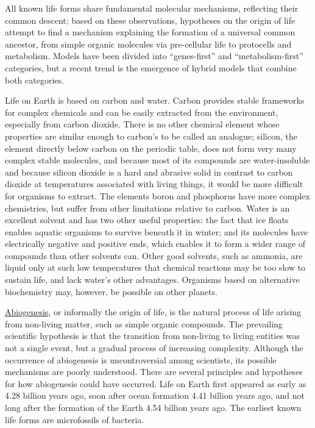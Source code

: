 All known life forms share fundamental molecular mechanisms, reflecting their common descent; based on these observations, hypotheses on the origin of life attempt to find a mechanism explaining the formation of a universal common ancestor, from simple organic molecules via pre-cellular life to protocells and metabolism. Models have been divided into ``genes-first'' and ``metabolism-first'' categories, but a recent trend is the emergence of hybrid models that combine both categories.

Life on Earth is based on carbon and water. Carbon provides stable frameworks for complex chemicals and can be easily extracted from the environment, especially from carbon dioxide. There is no other chemical element whose properties are similar enough to carbon's to be called an analogue; silicon, the element directly below carbon on the periodic table, does not form very many complex stable molecules, and because most of its compounds are water-insoluble and because silicon dioxide is a hard and abrasive solid in contrast to carbon dioxide at temperatures associated with living things, it would be more difficult for organisms to extract. The elements boron and phosphorus have more complex chemistries, but suffer from other limitations relative to carbon. Water is an excellent solvent and has two other useful properties: the fact that ice floats enables aquatic organisms to survive beneath it in winter; and its molecules have electrically negative and positive ends, which enables it to form a wider range of compounds than other solvents can. Other good solvents, such as ammonia, are liquid only at such low temperatures that chemical reactions may be too slow to sustain life, and lack water's other advantages. Organisms based on alternative biochemistry may, however, be possible on other planets.

\href{https://en.wikipedia.org/wiki/Abiogenesis}{Abiogenesis}, or informally the origin of life, is the natural process of life arising from non-living matter, such as simple organic compounds. The prevailing scientific hypothesis is that the transition from non-living to living entities was not a single event, but a gradual process of increasing complexity. Although the occurrence of abiogenesis is uncontroversial among scientists, its possible mechanisms are poorly understood. There are several principles and hypotheses for how abiogenesis could have occurred. Life on Earth first appeared as early as 4.28 billion years ago, soon after ocean formation 4.41 billion years ago, and not long after the formation of the Earth 4.54 billion years ago. The earliest known life forms are microfossils of bacteria.

